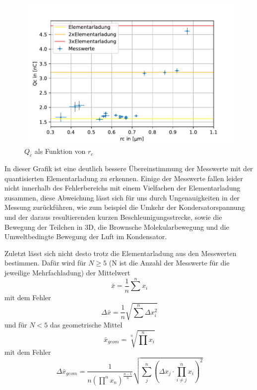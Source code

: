 \documentclass{scrartcl}
\begin{document}
            \begin{figure}[H]
                \centering
                \includegraphics[width=1.0\textwidth]{QoverRUncorrCunt.pdf}
                \caption{$Q_c$ als Funktion von $r_c$}
                \label{Abbildung6}
            \end{figure}
            In dieser Grafik ist eine deutlich bessere Übereinstimmung der Messwerte mit der quantisierten Elementarladung zu
            erkennen. Einige der Messwerte fallen leider nicht innerhalb des Fehlerbereichs mit einem Vielfachen der Elementarladung
            zusammen, diese Abweichung lässt sich für uns durch Ungenauigkeiten in der Messung zurückführen, wie zum beispiel
            die Umkehr der Kondersatorspannung und der daraus resultierenden kurzen Beschleunigungsstrecke, sowie die Bewegung der
            Teilchen in 3D, die Brownsche Molekularbewegung und die Umweltbedingte Bewegung der Luft im Kondensator.
            
            Zuletzt lässt sich nicht desto trotz die Elementarladung aus den Messwerten bestimmen. Dafür wird für $N \geq 5$ (N ist die Anzahl der
            Messwerte für die jeweilige Mehrfachladung)
            der Mittelwert 
            \begin{equation}
                \bar{x} = \frac{1}{n} \sum^n x_i
            \end{equation} 
            mit dem Fehler
            \begin{equation}
                \Delta \bar{x} = \frac{1}{n} \sqrt{\sum^n \Delta x_i^2} 
            \end{equation}
            und für $N < 5$ das geometrische Mittel
            \begin{equation}
                \bar{x}_{geom} = \sqrt[n]{\prod^n x_i}
            \end{equation}
            mit dem Fehler
            \begin{equation}
                \Delta \bar{x}_{geom} = \frac{1}{n (\prod^n x_n)^{\frac{n-1}{n}}} \sqrt{\sum_j^n (\Delta x_j \cdot \prod_{i\neq j}^n x_i)^2}
            \end{equation}
            
\end{document}
